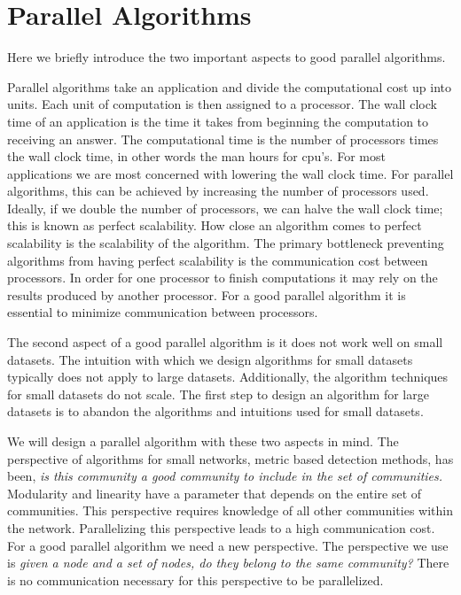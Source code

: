 \documentclass[phd,tocprelim]{cornell}
\begin{document}
\section{Parallel Algorithms}

Here we briefly introduce the two important aspects to good parallel algorithms.

Parallel algorithms take an application and divide the computational cost up into units.  Each unit of computation is then assigned to a processor.  The wall clock time of an application is the time it takes from beginning the computation to receiving an answer.  The computational time is the number of processors times the wall clock time, in other words the man hours for cpu's.  For most applications we are most concerned with lowering the wall clock time.  For parallel algorithms, this can be achieved by increasing the number of processors used.  Ideally, if we double the number of processors, we can halve the wall clock time; this is known as perfect scalability.  How close an algorithm comes to perfect scalability is the scalability of the algorithm.  The primary bottleneck preventing algorithms from having perfect scalability is the communication cost between processors.  In order for one processor to finish computations it may rely on the results produced by another processor.   For a good parallel algorithm it is essential to minimize communication between processors.

The second aspect of a good parallel algorithm is it does not work well on small datasets.  The intuition with which we design algorithms for small datasets typically does not apply to large datasets.  Additionally, the algorithm techniques for small datasets do not scale.  The first step to design an algorithm for large datasets is to abandon the algorithms and intuitions used for small datasets.

We will design a parallel algorithm with these two aspects in mind.  The perspective of algorithms for small networks, metric based detection methods, has been, {\it is this community a good community to include in the set of communities.}  Modularity and linearity have a parameter that depends on the entire set of communities.  This perspective requires knowledge of all other communities within the network.  Parallelizing this perspective leads to a high communication cost.  For a good parallel algorithm we need a new perspective.  The perspective we use is {\it given a node and a set of nodes, do they belong to the same community?}  There is no communication necessary for this perspective to be parallelized.
\end{document}
